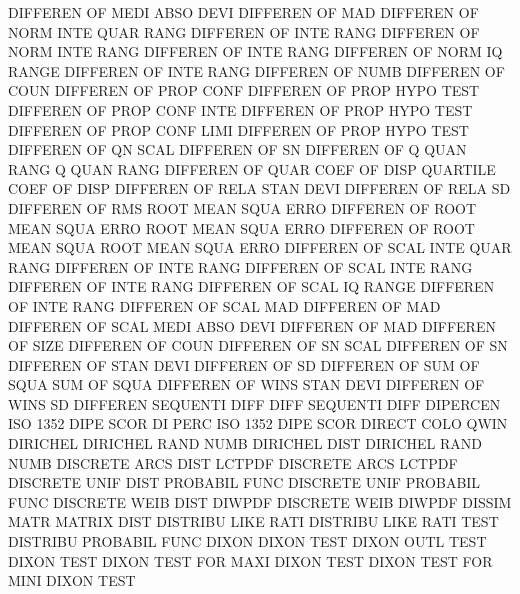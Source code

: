 DIFFEREN OF   MEDI ABSO DEVI            DIFFEREN OF   MAD
DIFFEREN OF   NORM INTE QUAR RANG       DIFFEREN OF   INTE RANG
DIFFEREN OF   NORM INTE RANG            DIFFEREN OF   INTE RANG
DIFFEREN OF   NORM IQ   RANGE           DIFFEREN OF   INTE RANG
DIFFEREN OF   NUMB                      DIFFEREN OF   COUN
DIFFEREN OF   PROP CONF                 DIFFEREN OF   PROP HYPO TEST
DIFFEREN OF   PROP CONF INTE            DIFFEREN OF   PROP HYPO TEST
DIFFEREN OF   PROP CONF LIMI            DIFFEREN OF   PROP HYPO TEST
DIFFEREN OF   QN   SCAL                 DIFFEREN OF   SN
DIFFEREN OF   Q    QUAN RANG            Q        QUAN RANG
DIFFEREN OF   QUAR COEF OF   DISP       QUARTILE COEF OF   DISP
DIFFEREN OF   RELA STAN DEVI            DIFFEREN OF   RELA SD
DIFFEREN OF   RMS                       ROOT     MEAN SQUA ERRO
DIFFEREN OF   ROOT MEAN SQUA ERRO       ROOT     MEAN SQUA ERRO
DIFFEREN OF   ROOT MEAN SQUA            ROOT     MEAN SQUA ERRO
DIFFEREN OF   SCAL INTE QUAR RANG       DIFFEREN OF   INTE RANG
DIFFEREN OF   SCAL INTE RANG            DIFFEREN OF   INTE RANG
DIFFEREN OF   SCAL IQ   RANGE           DIFFEREN OF   INTE RANG
DIFFEREN OF   SCAL MAD                  DIFFEREN OF   MAD
DIFFEREN OF   SCAL MEDI ABSO DEVI       DIFFEREN OF   MAD
DIFFEREN OF   SIZE                      DIFFEREN OF   COUN
DIFFEREN OF   SN   SCAL                 DIFFEREN OF   SN
DIFFEREN OF   STAN DEVI                 DIFFEREN OF   SD
DIFFEREN OF   SUM  OF   SQUA            SUM      OF   SQUA
DIFFEREN OF   WINS STAN DEVI            DIFFEREN OF   WINS SD
DIFFEREN                                SEQUENTI DIFF
DIFF                                    SEQUENTI DIFF
DIPERCEN                                ISO      1352 DIPE SCOR
DI       PERC                           ISO      1352 DIPE SCOR
DIRECT   COLO                           QWIN
DIRICHEL                                DIRICHEL RAND NUMB
DIRICHEL DIST                           DIRICHEL RAND NUMB
DISCRETE ARCS DIST                      LCTPDF
DISCRETE ARCS                           LCTPDF
DISCRETE UNIF DIST                      PROBABIL FUNC
DISCRETE UNIF                           PROBABIL FUNC
DISCRETE WEIB DIST                      DIWPDF
DISCRETE WEIB                           DIWPDF
DISSIM   MATR                           MATRIX   DIST
DISTRIBU LIKE RATI                      DISTRIBU LIKE RATI TEST
DISTRIBU                                PROBABIL FUNC
DIXON                                   DIXON    TEST
DIXON    OUTL TEST                      DIXON    TEST
DIXON    TEST FOR  MAXI                 DIXON    TEST
DIXON    TEST FOR  MINI                 DIXON    TEST
